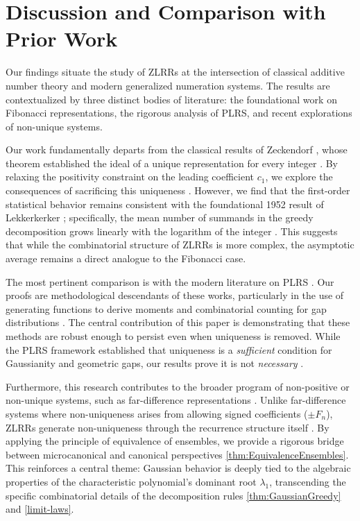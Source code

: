 \documentclass[11pt]{amsart}
\theoremstyle{plain}
\numberwithin{equation}{section} %
\numberwithin{table}{section} %
\numberwithin{figure}{section}
\begin{document}
	
	
	
	\section{Discussion and Comparison with Prior Work}
	
	Our findings situate the study of ZLRRs at the intersection of classical additive number theory and modern generalized numeration systems. The results are contextualized by three distinct bodies of literature: the foundational work on Fibonacci representations, the rigorous analysis of PLRS, and recent explorations of non-unique systems.
	
	Our work fundamentally departs from the classical results of Zeckendorf \cite{zeckendorf1972}, whose theorem established the ideal of a unique representation for every integer \cite{zeckendorf1972}. By relaxing the positivity constraint on the leading coefficient $c_1$, we explore the consequences of sacrificing this uniqueness \cite{MartinezEtAl2022_I}. However, we find that the first-order statistical behavior remains consistent with the foundational 1952 result of Lekkerkerker \cite{lekkerkerker1952}; specifically, the mean number of summands in the greedy decomposition grows linearly with the logarithm of the integer \cite{lekkerkerker1952}. This suggests that while the combinatorial structure of ZLRRs is more complex, the asymptotic average remains a direct analogue to the Fibonacci case.
	
	The most pertinent comparison is with the modern literature on PLRS \cite{kologlu2011summands, MillerWang2012JCTA, bower2015gaps}. Our proofs are methodological descendants of these works, particularly in the use of generating functions to derive moments and combinatorial counting for gap distributions \cite{MillerWang2012JCTA, bower2015gaps}. The central contribution of this paper is demonstrating that these methods are robust enough to persist even when uniqueness is removed. While the PLRS framework established that uniqueness is a \textit{sufficient} condition for Gaussianity and geometric gaps, our results prove it is not \textit{necessary} \cite{MillerWang2012JCTA}. 
	
	Furthermore, this research contributes to the broader program of non-positive or non-unique systems, such as far-difference representations \cite{miller2016far}. Unlike far-difference systems where non-uniqueness arises from allowing signed coefficients ($\pm F_n$), ZLRRs generate non-uniqueness through the recurrence structure itself \cite{miller2016far}. By applying the principle of equivalence of ensembles, we provide a rigorous bridge between microcanonical and canonical perspectives \ref{thm:EquivalenceEnsembles}. This reinforces a central theme: Gaussian behavior is deeply tied to the algebraic properties of the characteristic polynomial's dominant root $\lambda_1$, transcending the specific combinatorial details of the decomposition rules \ref{thm:GaussianGreedy} and \ref{limit-laws}.
	
\end{document}
